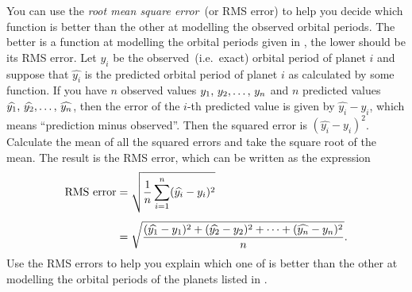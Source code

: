 \documentclass[a4paper,oneside,12pt]{article}
\begin{document}
\begin{problem}
\begin{packedenum}
  \item\label{subprob:planetary_orbit_RMS_error}
    You can use the \emph{root mean square error}~(or RMS error) to
    help you decide which function is better than the other at
    modelling the observed orbital periods.  The better is a function
    at modelling the orbital periods given in
    , the lower should be its RMS
    error.  Let $y_i$ be the observed~(i.e.~exact) orbital period of
    planet $i$ and suppose that $\widehat{y_i}$ is the predicted
    orbital period of planet $i$ as calculated by some function.  If
    you have $n$ observed values ${y_1},\, {y_2}, \dots,\, {y_n}$ and $n$
    predicted values
    ${\widehat{y_1}},\, {\widehat{y_2}}, \dots,\, {\widehat{y_n}}$, then the
    error of the $i$-th predicted value is given by
    $\widehat{y_i} - y_i$, which means ``prediction minus observed''.
    Then the squared error is $(\widehat{y_i} - y_i)^2$.  Calculate
    the mean of all the squared errors and take the square root of the
    mean.  The result is the RMS error, which can be written as the
    expression
    \begin{align*}
    \text{RMS error}
    &=
    \sqrt{
      \frac{1}{n}
      \sum_{i=1}^n (\widehat{y_i} - y_i)^2
    } \\[4pt]
    &=
    \sqrt{
      \frac{
        {
          (\widehat{y_1} - y_1)^2
        } + {
          (\widehat{y_2} - y_2)^2
        } + \cdots + {
          (\widehat{y_n} - y_n)^2
        }
      }{
        n
      }
    }.
    \end{align*}
    Use the RMS errors to help you explain which one of
    is better than the other at modelling the orbital periods of the
    planets listed in .
  \end{packedenum}
\end{problem}
\end{document}
